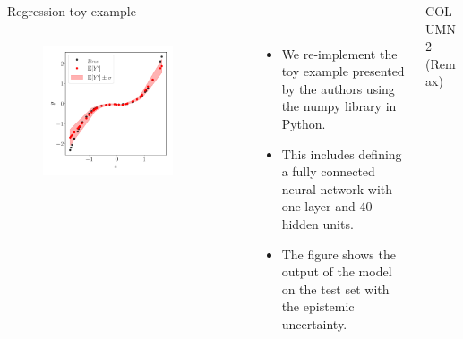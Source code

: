 \documentclass[final]{beamer}
\begin{document}
\begin{frame}[t]
\begin{columns}
\begin{column}[T]{.31\textwidth}
\begin{block}{Regression toy example}
\begin{columns}
\begin{column}{0.5\textwidth}
  \begin{figure}[h!]
 \centering
  \includegraphics[width=0.8\textwidth]{Figures/toy_example.pdf}
 \end{figure}
 \end{column}
 \begin{column}{0.5\textwidth}
 \begin{itemize}
 \item We re-implement the toy example presented by the authors using the numpy library in Python.
 \item This includes defining a fully connected neural network with one layer and 40 hidden units.
 \item The figure shows the output of the model on the test set with the epistemic uncertainty.
\end{itemize}
 \end{column}
\end{columns}
\end{block}
\end{column}
\begin{column}[T]{.31\textwidth}

{\Large COLUMN 2 (Remax)}


\end{column}




\end{columns}
\end{frame}
\end{document}
